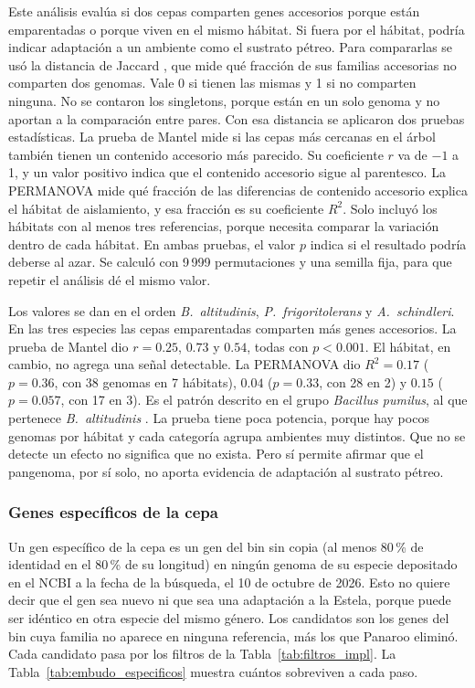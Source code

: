 Este análisis evalúa si dos cepas comparten genes accesorios porque están
emparentadas o porque viven en el mismo hábitat. Si fuera por el hábitat, podría
indicar adaptación a un ambiente como el sustrato pétreo. Para compararlas se
usó la distancia de Jaccard \cite{jaccard1912}, que mide qué fracción de sus
familias accesorias no comparten dos genomas. Vale 0 si tienen las mismas y 1
si no comparten ninguna. No se contaron los singletons, porque están en un solo
genoma y no aportan a la comparación entre pares. Con esa distancia se
aplicaron dos pruebas estadísticas. La prueba de Mantel \cite{mantel1967} mide
si las cepas más cercanas en el árbol también tienen un contenido accesorio más
parecido. Su coeficiente $r$ va de $-1$ a 1, y un valor positivo indica que el
contenido accesorio sigue al parentesco. La PERMANOVA \cite{anderson2001} mide
qué fracción de las diferencias de contenido accesorio explica el hábitat de
aislamiento, y esa fracción es su coeficiente $R^2$. Solo incluyó los hábitats
con al menos tres referencias, porque necesita comparar la variación dentro de
cada hábitat. En ambas pruebas, el valor $p$ indica si el resultado podría
deberse al azar. Se calculó con 9\,999 permutaciones y una semilla fija, para
que repetir el análisis dé el mismo valor.

Los valores se dan en el orden \textit{B.~altitudinis},
\textit{P.~frigoritolerans} y \textit{A.~schindleri}. En las tres especies las
cepas emparentadas comparten más genes accesorios. La prueba de Mantel dio
$r = 0.25$, $0.73$ y $0.54$, todas con $p < 0.001$. El hábitat, en cambio, no
agrega una señal detectable. La PERMANOVA dio $R^2 = 0.17$ ($p = 0.36$, con 38
genomas en 7 hábitats), $0.04$ ($p = 0.33$, con 28 en 2) y $0.15$
($p = 0.057$, con 17 en 3). Es el patrón descrito en el grupo
\textit{Bacillus pumilus}, al que pertenece \textit{B.~altitudinis}
\cite{fu2021}. La prueba tiene poca potencia, porque hay pocos genomas por hábitat y cada
categoría agrupa ambientes muy distintos. Que no se detecte un efecto no significa
que no exista. Pero sí permite afirmar que el pangenoma, por sí solo, no aporta
evidencia de adaptación al sustrato pétreo.



\subsubsection{Genes específicos de la cepa}
\label{subsubsec:res_especificos}

Un gen específico de la cepa es un gen del bin sin copia (al menos 80\,\% de
identidad en el 80\,\% de su longitud) en ningún genoma de su especie depositado
en el NCBI a la fecha de la búsqueda, el 10 de octubre de 2026. Esto no quiere decir 
que el gen sea nuevo ni que sea una
adaptación a la Estela, porque puede ser idéntico en otra especie del mismo
género. Los candidatos son los genes del bin cuya familia no aparece en ninguna
referencia, más los que Panaroo eliminó. Cada candidato pasa por los filtros de
la Tabla~\ref{tab:filtros_impl}. La Tabla~\ref{tab:embudo_especificos} muestra
cuántos sobreviven a cada paso.



